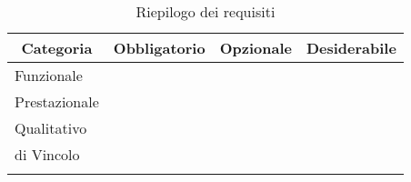 \begin{longtable}{|l|c|c|c|}
	\hline \multicolumn{1}{|c|}{\textbf{Categoria}} & \multicolumn{1}{c|}{\textbf{Obbligatorio}} & \multicolumn{1}{c|}{\textbf{Opzionale}} & \multicolumn{1}{c|}{\textbf{Desiderabile}} \\
	\endfirsthead
	\hline Funzionale & \thetotObF & \thetotOpF & \thetotDF \\
	\hline Prestazionale & \thetotObP & \thetotOpP & \thetotDP \\
	\hline Qualitativo & \thetotObQ & \thetotOpQ & \thetotDQ \\
	\hline di Vincolo & \thetotObV & \thetotOpV & \thetotDV \\
	\hline
	\caption{Riepilogo dei requisiti}
\end{longtable}
